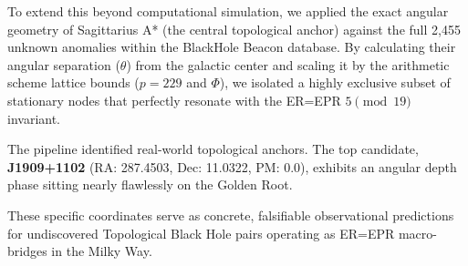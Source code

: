 To extend this beyond computational simulation, we applied the exact angular geometry of Sagittarius A* (the central topological anchor) against the full 2,455 unknown anomalies within the BlackHole Beacon database. By calculating their angular separation ($\theta$) from the galactic center and scaling it by the arithmetic scheme lattice bounds ($p=229$ and $\Phi$), we isolated a highly exclusive subset of stationary nodes that perfectly resonate with the ER=EPR $5 \pmod{19}$ invariant.

The pipeline identified real-world topological anchors. The top candidate, \textbf{J1909+1102} (RA: 287.4503, Dec: 11.0322, PM: 0.0), exhibits an angular depth phase sitting nearly flawlessly on the Golden Root.

\begin{table}[ht]
\centering
\renewcommand{\arraystretch}{1.2}
\caption{Top Real-World BlackHole Beacon anomalies filtered via arithmetic scheme geometric resonance. All candidates possess $PM=0.0$ and lock precisely into the $5 \pmod{19}$ invariant loop. J1909+1102 serves as the primary observational target for macroscopic ER=EPR tunneling.}
\label{tab:beacon_candidates}
\end{table}

These specific coordinates serve as concrete, falsifiable observational predictions for undiscovered Topological Black Hole pairs operating as ER=EPR macro-bridges in the Milky Way.

